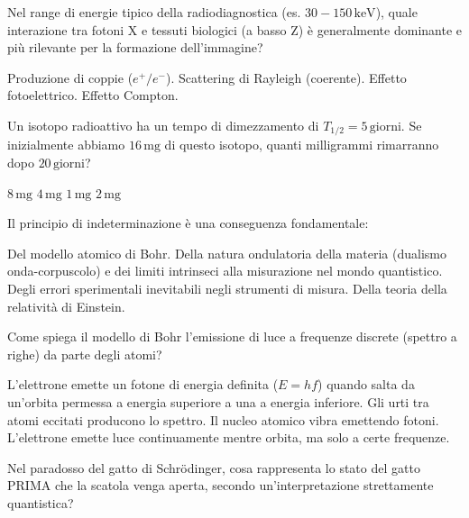 \documentclass{exam}%
\begin{document}
\begin{questions}%
\question Nel range di energie tipico della radiodiagnostica (es. $30-150 \, \text{keV}$), quale interazione tra fotoni X e tessuti biologici (a basso Z) è generalmente dominante e più rilevante per la formazione dell'immagine?%
\vspace{0.2em}%
\begin{multicols}{2}%
\begin{choices}%
\choice Produzione di coppie ($e^+/e^-$).%
\choice Scattering di Rayleigh (coerente).%
\choice Effetto fotoelettrico.%
\choice Effetto Compton.%
\end{choices}%
\end{multicols}%
\question Un isotopo radioattivo ha un tempo di dimezzamento di $T_{1/2} = 5 \, \text{giorni}$. Se inizialmente abbiamo $16 \, \text{mg}$ di questo isotopo, quanti milligrammi rimarranno dopo $20 \, \text{giorni}$?%
\vspace{0.2em}%
\begin{multicols}{4}%
\begin{choices}%
\choice $8 \, \text{mg}$%
\choice $4 \, \text{mg}$%
\choice $1 \, \text{mg}$%
\choice $2 \, \text{mg}$%
\end{choices}%
\end{multicols}%
\question Il principio di indeterminazione è una conseguenza fondamentale:%
\vspace{0.2em}%
\begin{choices}%
\choice Del modello atomico di Bohr.%
\choice Della natura ondulatoria della materia (dualismo onda-corpuscolo) e dei limiti intrinseci alla misurazione nel mondo quantistico.%
\choice Degli errori sperimentali inevitabili negli strumenti di misura.%
\choice Della teoria della relatività di Einstein.%
\end{choices}%
\question Come spiega il modello di Bohr l'emissione di luce a frequenze discrete (spettro a righe) da parte degli atomi?%
\vspace{0.2em}%
\begin{choices}%
\choice L'elettrone emette un fotone di energia definita ($E = hf$) quando salta da un'orbita permessa a energia superiore a una a energia inferiore.%
\choice Gli urti tra atomi eccitati producono lo spettro.%
\choice Il nucleo atomico vibra emettendo fotoni.%
\choice L'elettrone emette luce continuamente mentre orbita, ma solo a certe frequenze.%
\end{choices}%
\question Nel paradosso del gatto di Schrödinger, cosa rappresenta lo stato del gatto PRIMA che la scatola venga aperta, secondo un'interpretazione strettamente quantistica?%

\end{questions}
\end{document}
